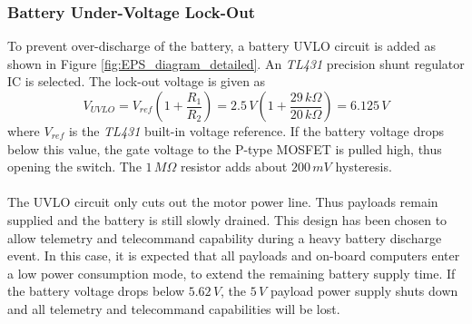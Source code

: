 \subsubsection{Battery Under-Voltage Lock-Out}
To prevent over-discharge of the battery, a battery \ac{UVLO} circuit is added as shown in Figure \ref{fig:EPS_diagram_detailed}. An \textit{TL431} precision shunt regulator \ac{IC} is selected. The lock-out voltage is given as
%
\begin{equation}
V_{UVLO}=V_{ref}(1+\dfrac{R_1}{R_2})=2.5\,V(1+\dfrac{29\,k \Omega}{20\,k \Omega})=6.125\,V
\end{equation}
%
where $V_{ref}$ is the \textit{TL431} built-in voltage reference. If the battery voltage drops below this value, the gate voltage to the P-type \ac{MOSFET} is pulled high, thus opening the switch. The $1\,M \Omega$ resistor adds about $200\,mV$ hysteresis. 
\\
\\
The \ac{UVLO} circuit only cuts out the motor power line. Thus payloads remain supplied and the battery is still slowly drained. This design has been chosen to allow  telemetry and telecommand capability during a heavy battery discharge event. In this case, it is expected that all payloads and on-board computers enter a low power consumption mode, to extend the remaining battery supply time. If the battery voltage drops below $5.62\,V$, the $5\,V$ payload power supply shuts down and all telemetry and telecommand capabilities will be lost.
%
%
